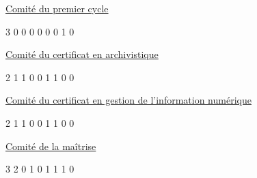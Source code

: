 \documentclass [12 pt]{article}
\begin{document}
                        
                            
                                
        \href{
        https://wiki.umontreal.ca/pages/viewpage.action?pageId=124095459#coprec
        } {
        Comité du premier cycle
        }
    
                            
                            3
                            0
                            0
                            0
                            0
                            0
                            0
                            1
                            0
                        
                        
                            
                                
        \href{
        https://wiki.umontreal.ca/pages/viewpage.action?pageId=124095459#coca
        } {
        Comité du certificat en archivistique
        }
    
                            
                            2
                            1
                            1
                            0
                            0
                            1
                            1
                            0
                            0
                        
                        
                            
                                
        \href{
        https://wiki.umontreal.ca/pages/viewpage.action?pageId=124095459#cogin
        } {
        Comité du certificat en gestion de l'information
                                    numérique
        }
    
                            
                            2
                            1
                            1
                            0
                            0
                            1
                            1
                            0
                            0
                        
                        
                            
                                
        \href{
        https://wiki.umontreal.ca/pages/viewpage.action?pageId=124095459#comsi
        } {
        Comité de la maîtrise
        }
    
                            
                            3
                            2
                            0
                            1
                            0
                            1
                            1
                            1
                            0
                        
\end{document}
